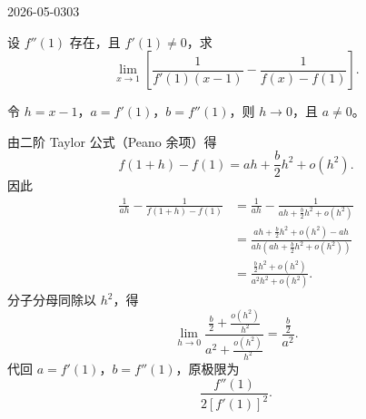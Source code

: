\begin{mistake}{2026-05-03}{03}

\begin{problemcontent}
设 \(f''(1)\) 存在，且 \(f'(1)\ne 0\)，求
\[
\lim_{x\to 1}\left[\frac{1}{f'(1)(x-1)}-\frac{1}{f(x)-f(1)}\right].
\]
\end{problemcontent}

\begin{solutioncontent}
令 \(h=x-1\)，\(a=f'(1)\)，\(b=f''(1)\)，则 \(h\to 0\)，且 \(a\ne 0\)。

由二阶 Taylor 公式（Peano 余项）得
\[
f(1+h)-f(1)=ah+\frac{b}{2}h^2+o(h^2).
\]
因此
\[
\begin{aligned}
\frac{1}{ah}-\frac{1}{f(1+h)-f(1)}
&=\frac{1}{ah}-\frac{1}{ah+\frac{b}{2}h^2+o(h^2)}\\
&=\frac{ah+\frac{b}{2}h^2+o(h^2)-ah}{ah\left(ah+\frac{b}{2}h^2+o(h^2)\right)}\\
&=\frac{\frac{b}{2}h^2+o(h^2)}{a^2h^2+o(h^2)}.
\end{aligned}
\]
分子分母同除以 \(h^2\)，得
\[
\lim_{h\to 0}\frac{\frac{b}{2}+\frac{o(h^2)}{h^2}}{a^2+\frac{o(h^2)}{h^2}}
=\frac{\frac{b}{2}}{a^2}.
\]
代回 \(a=f'(1)\)，\(b=f''(1)\)，原极限为
\[
\boxed{\frac{f''(1)}{2\left[f'(1)\right]^2}}.
\]
\end{solutioncontent}


\end{mistake}
